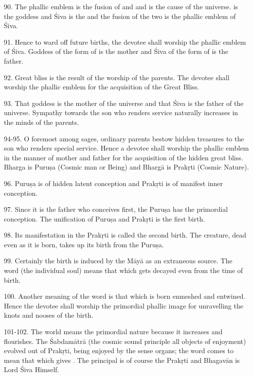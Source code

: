 90. The phallic emblem is the fusion of  and  and is
the cause of the universe.  is the goddess and Śiva is the 
and the fusion of the two is the phallic emblem of Śiva.

91. Hence to ward off future births, the devotee shall worship the phallic
emblem of Śiva. Goddess of the form of  is the mother and Śiva of
the form of  is the father.

92. Great bliss is the result of the worship of the parents. The devotee shall
worship the phallic emblem for the acquisition of the Great Bliss.

93. That goddess is the mother of the universe and that Śiva is the father of
the universe. Sympathy towards the son who renders service naturally increases
in the minds of the parents.

94-95. O foremost among sages, ordinary parents bestow hidden treasures to
the son who renders special service. Hence a devotee shall worship the phallic
emblem in the manner of mother and father for the acquisition of the hidden
great bliss. Bharga is Puruṣa (Cosmic man or Being) and Bhargā is Prakṛti
(Cosmic Nature).

96. Puruṣa is of hidden latent conception and Prakṛti is of manifest inner
conception.

97. Since it is the father who conceives first, the Puruṣa has the primordial
conception. The unification of Puruṣa and Prakṛti is the first birth.

98. Its manifestation in the Prakṛti is called the second birth. The creature,
dead even as it is born, takes up its birth from the Puruṣa.

99. Certainly the birth is induced by the Māyā as an extraneous source. The word
 (the individual soul) means that which gets decayed even from
the time of birth.

100. Another meaning of the word  is that which is born enmeshed and
entwined. Hence the devotee shall worship the primordial phallic image for
unravelling the knots and nooses of the birth.

101-102. The world  means the primordial nature because it increases
and flourishes. The Śabdamātrā \etc (the cosmic sound principle \ie all objects
of enjoyment) evolved out of Prakṛti, being enjoyed by the sense organs;
the word  comes to mean that which gives . The principal
 is of course the Prakṛti and Bhagavān is Lord Śiva Himself.

